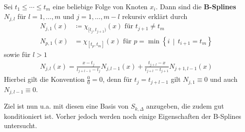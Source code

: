 \begin{Defe}
  Sei $t_1\leq \dotsb \leq t_m$ eine beliebige Folge von Knoten
  $x_i$.
  Dann sind die \textbf{B-Splines}
  $N_{j,l}$ für $l=1,\dotsc, m$ und $j=1,\dotsc, m-l$ 
  rekursiv erklärt durch
  \begin{align}\nonumber
    N_{j,1}(x) &\coloneqq \chi_{[t_j,t_{j+1})}(x) 
                 \text{ für } t_{j+1}\neq t_m\\
    N_{p,1}(x) &= \chi_{[t_p,t_m]}(x) 
                 \text{ für }
                 p=\min\left\{i\,\middle\vert\,t_{i+1}=t_m\right\}
                 \label{VI.2.3}
  \end{align}
  sowie für $l>1$
  \begin{gather}
    N_{j,l} (x) = \frac{x-t_j}{t_{j+l-1}-t_j}N_{j,l-1}(x) 
    +  \frac{t_{j+l}-x}{t_{j+l}-t_{j+1}}N_{j+1,l-1}(x) 
    \label{VI.2.4}
  \end{gather}
  Hierbei gilt die Konvention $\frac{0}{0}=0$, 
  denn für $t_j=t_{j+l-1}$ gilt
  $N_{j,1}\equiv 0$ und auch $N_{j,l-1}\equiv 0$.
\end{Defe}

Ziel ist nun u.a. mit diesen eine Basis von $S_{k,\Delta}$ anzugeben,
die zudem gut konditioniert ist.
Vorher jedoch werden noch einige Eigenschaften der B-Splines
untersucht.


